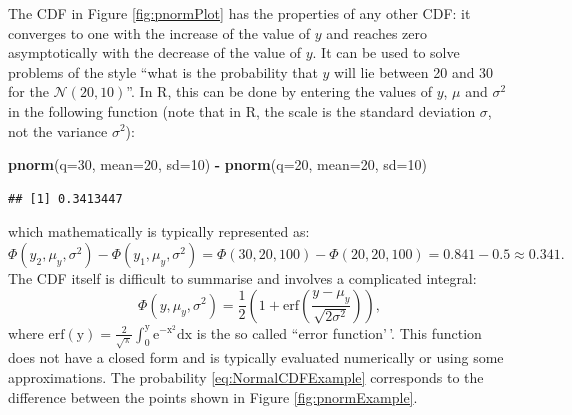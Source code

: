 \documentclass[
]{book}
\newenvironment{Shaded}{\begin{snugshade}}{\end{snugshade}}
\newcommand{\DataTypeTok}[1]{\textcolor[rgb]{0.13,0.29,0.53}{#1}}
\newcommand{\DecValTok}[1]{\textcolor[rgb]{0.00,0.00,0.81}{#1}}
\newcommand{\KeywordTok}[1]{\textcolor[rgb]{0.13,0.29,0.53}{\textbf{#1}}}
\newcommand{\NormalTok}[1]{#1}
\newcommand{\OperatorTok}[1]{\textcolor[rgb]{0.81,0.36,0.00}{\textbf{#1}}}
\newcommand{\StringTok}[1]{\textcolor[rgb]{0.31,0.60,0.02}{#1}}
\theoremstyle{definition}
\theoremstyle{definition}
\theoremstyle{definition}
\theoremstyle{definition}
\theoremstyle{remark}
\begin{document}
The CDF in Figure \ref{fig:pnormPlot} has the properties of any other CDF: it converges to one with the increase of the value of \(y\) and reaches zero asymptotically with the decrease of the value of \(y\). It can be used to solve problems of the style ``what is the probability that \(y\) will lie between 20 and 30 for the \(\mathcal{N}(20, 10)\)''. In R, this can be done by entering the values of \(y\), \(\mu\) and \(\sigma^2\) in the following function (note that in R, the scale is the standard deviation \(\sigma\), not the variance \(\sigma^2\)):

\begin{Shaded}
\begin{Highlighting}[]
\KeywordTok{pnorm}\NormalTok{(}\DataTypeTok{q=}\DecValTok{30}\NormalTok{, }\DataTypeTok{mean=}\DecValTok{20}\NormalTok{, }\DataTypeTok{sd=}\DecValTok{10}\NormalTok{) }\OperatorTok{{-}}\StringTok{ }\KeywordTok{pnorm}\NormalTok{(}\DataTypeTok{q=}\DecValTok{20}\NormalTok{, }\DataTypeTok{mean=}\DecValTok{20}\NormalTok{, }\DataTypeTok{sd=}\DecValTok{10}\NormalTok{)}
\end{Highlighting}
\end{Shaded}

\begin{verbatim}
## [1] 0.3413447
\end{verbatim}

which mathematically is typically represented as:
\begin{equation}
    \Phi(y_2, \mu_y, \sigma^2) - \Phi(y_1, \mu_y, \sigma^2) = \Phi(30, 20, 100) - \Phi(20, 20, 100) = 0.841 - 0.5 \approx 0.341.
    \label{eq:NormalCDFExample}
\end{equation}
The CDF itself is difficult to summarise and involves a complicated integral:
\begin{equation}
    \Phi(y, \mu_y, \sigma^2) = \frac{1}{2} \left(1 + \mathrm{erf}\left(\frac{y-\mu_y}{\sqrt{2\sigma^2}} \right) \right),
    \label{eq:NormalCDFE}
\end{equation}
where \(\mathrm{erf(y)= \frac{2}{\sqrt{\pi}} \int_{0}^{y} e^{-x^2} dx}\) is the so called ``error function'\,'. This function does not have a closed form and is typically evaluated numerically or using some approximations. The probability \eqref{eq:NormalCDFExample} corresponds to the difference between the points shown in Figure \ref{fig:pnormExample}.
\end{document}
